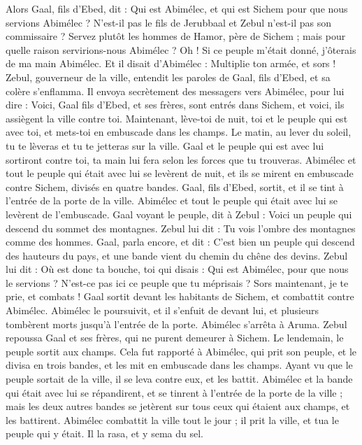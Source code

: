 \begin{multicols}{2}
Alors Gaal, fils d'Ebed, dit : Qui est Abimélec, et qui est Sichem pour que nous servions Abimélec ? N'est-il pas le fils de Jerubbaal et Zebul n'est-il pas son commissaire ? Servez plutôt les hommes de Hamor, père de Sichem ; mais pour quelle raison servirions-nous Abimélec ?
Oh ! Si ce peuple m'était donné, j'ôterais de ma main Abimélec. Et il disait d'Abimélec : Multiplie ton armée, et sors !
Zebul, gouverneur de la ville, entendit les paroles de Gaal, fils d'Ebed, et sa colère s'enflamma.
Il envoya secrètement des messagers vers Abimélec, pour lui dire : Voici, Gaal fils d'Ebed, et ses frères, sont entrés dans Sichem, et voici, ils assiègent la ville contre toi.
Maintenant, lève-toi de nuit, toi et le peuple qui est avec toi, et mets-toi en embuscade dans les champs.
Le matin, au lever du soleil, tu te lèveras et tu te jetteras sur la ville. Gaal et le peuple qui est avec lui sortiront contre toi, ta main lui fera selon les forces que tu trouveras.
Abimélec et tout le peuple qui était avec lui se levèrent de nuit, et ils se mirent en embuscade contre Sichem, divisés en quatre bandes.
Gaal, fils d'Ebed, sortit, et il se tint à l'entrée de la porte de la ville. Abimélec et tout le peuple qui était avec lui se levèrent de l'embuscade.
Gaal voyant le peuple, dit à Zebul : Voici un peuple qui descend du sommet des montagnes. Zebul lui dit : Tu vois l'ombre des montagnes comme des hommes.
Gaal, parla encore, et dit : C'est bien un peuple qui descend des hauteurs du pays, et une bande vient du chemin du chêne des devins.
Zebul lui dit : Où est donc ta bouche, toi qui disais : Qui est Abimélec, pour que nous le servions ? N'est-ce pas ici ce peuple que tu méprisais ? Sors maintenant, je te prie, et combats !
Gaal sortit devant les habitants de Sichem, et combattit contre Abimélec.
Abimélec le poursuivit, et il s'enfuit de devant lui, et plusieurs tombèrent morts jusqu'à l'entrée de la porte.
Abimélec s'arrêta à Aruma. Zebul repoussa Gaal et ses frères, qui ne purent demeurer à Sichem.
Le lendemain, le peuple sortit aux champs. Cela fut rapporté à Abimélec,
qui prit son peuple, et le divisa en trois bandes, et les mit en embuscade dans les champs. Ayant vu que le peuple sortait de la ville, il se leva contre eux, et les battit.
Abimélec et la bande qui était avec lui se répandirent, et se tinrent à l'entrée de la porte de la ville ; mais les deux autres bandes se jetèrent sur tous ceux qui étaient aux champs, et les battirent.
Abimélec combattit la ville tout le jour ; il prit la ville, et tua le peuple qui y était. Il la rasa, et y sema du sel.

\end{multicols}

